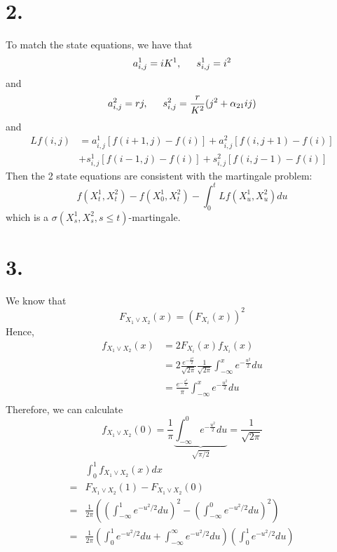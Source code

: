 \documentclass[11pt]{article}
\begin{document}
\section*{2.}
To match the state equations, we have that 
\[
    a_{i,j}^1 =  iK^1, \indent s_{i,j}^1 = i^2
\]
and 
\[
    a_{i,j}^2 = rj , \indent s_{i,j}^2 = \frac{r}{K^2}(j^2 + \alpha_{21}ij)
\]
and 
\begin{equation*}
    \begin{aligned}
        Lf(i,j) &= a_{i, j}^1 [f(i+1,j) - f(i)] + a_{i, j}^2 [f(i,j+1) - f(i)] \\
        &+ s_{i, j}^1 [f(i-1,j) - f(i)] + s_{i, j}^2 [f(i,j-1) - f(i)] 
    \end{aligned}
\end{equation*}
Then the 2 state equations are consistent with the martingale problem:
\[
    f(X_t^1, X_t^2) - f(X_0^1, X_t^2) - \int_0^t Lf(X_u^1, X_u^2) du    
\]
which is a $\sigma(X^1_s, X^2_s, s \le t)$-martingale.
\newpage
\section*{3.}
We know that 
\[
    F_{X_1 \vee X_2}(x) = \left(F_{X_i}(x) \right)^2     
\]
Hence, 
\begin{equation*}
    \begin{aligned}
        f_{X_1 \vee X_2}(x) &= 2 F_{X_i}(x) f_{X_i}(x) \\
        &= 2 \frac{e^{- \frac{x^2}{2}}}{\sqrt{2\pi}} \frac{1}{\sqrt{2\pi}} \int_{-\infty}^x e^{-\frac{u^2}{2}}du  \\
        &= \frac{e^{- \frac{x^2}{2}}}{\pi}  \int_{-\infty}^x e^{-\frac{u^2}{2}}du  \\
    \end{aligned}
\end{equation*}
Therefore, we can calculate 
\[
    f_{X_1 \vee X_2}(0) = \frac{1}{\pi} \underbrace{\int_{-\infty}^0 e^{-\frac{u^2}{2}}du}_{\sqrt{\pi/2}} = \frac{1}{\sqrt{2\pi}}
\]
\begin{equation*}
    \begin{aligned}
        &\int_0^1 f_{X_1 \vee X_2}(x) dx\\
        =& F_{X_1 \vee X_2}(1) - F_{X_1 \vee X_2}(0) \\
        =& \frac{1}{2\pi} \left(\left( \int_{-\infty }^1 e^{-u^2/2} du \right)^2 - \left( \int_{-\infty}^0 e^{-u^2/2} du\right)^2 \right) \\
        =& \frac{1}{2\pi} \left( \int_0^1 e^{-u^2/2} du+ \int_{-\infty}^\infty e^{-u^2/2}du\right) \left( \int_0^1 e^{-u^2/2} du \right) 
    \end{aligned}
\end{equation*}
\newpage
\end{document}
